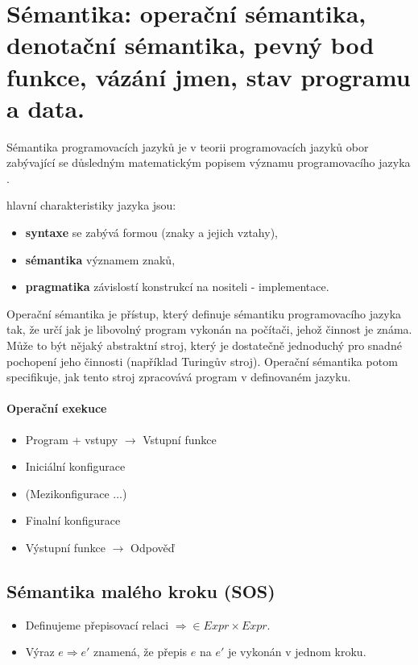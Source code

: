 \section[TPJ - sémantiky: operační, denotační]{Sémantika: operační sémantika, denotační sémantika, pevný bod funkce, vázání jmen, stav programu a data.}

\noindent Sémantika programovacích jazyků je v teorii programovacích jazyků obor zabývající se důsledným matematickým popisem významu programovacího jazyka \cite{wiki:semantika}.

 hlavní charakteristiky jazyka jsou: 

\begin{itemize}[itemsep=0px]
\item \textbf{syntaxe} se zabývá formou (znaky a jejich vztahy),
\item \textbf{sémantika} významem znaků,
\item \textbf{pragmatika} závislostí konstrukcí na nositeli - implementace.
\end{itemize}

Operační sémantika je přístup, který definuje sémantiku programovacího jazyka tak, že určí jak je libovolný program vykonán na počítači, jehož činnost je známa. Může to být nějaký abstraktní stroj, který je dostatečně jednoduchý pro snadné pochopení jeho činnosti (například Turingův stroj). Operační sémantika potom specifikuje, jak tento stroj zpracovává program v definovaném jazyku.

\paragraph{Operační exekuce}

\begin{itemize}[itemsep=0px]
\item Program + vstupy $\rightarrow$ Vstupní funkce
\item Iniciální konfigurace
\item (Mezikonfigurace ...)
\item Finalní konfigurace
\item Výstupní funkce $\rightarrow$ Odpověď
\end{itemize}

\subsection{Sémantika malého kroku (SOS)}
\begin{itemize}[itemsep=0px]
\item Definujeme přepisovací relaci $\Rightarrow \in Expr \times Expr$.
\item Výraz $e \Rightarrow e'$ znamená, že přepis $e$ na $e'$ je vykonán v jednom kroku.
\end{itemize}

